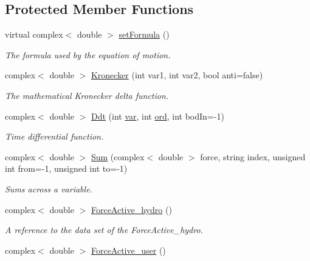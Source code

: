 \subsection*{Protected Member Functions}
\begin{DoxyCompactItemize}
\item 
virtual complex$<$ double $>$ \hyperlink{class_equationof_motion_a1d8614b11de9396f3795e4b560e6c368}{set\-Formula} ()
\begin{DoxyCompactList}\small\item\em The formula used by the equation of motion. \end{DoxyCompactList}\item 
complex$<$ double $>$ \hyperlink{class_equationof_motion_ad4ba6707460a9db7f8103157af0cae65}{Kronecker} (int var1, int var2, bool anti=false)
\begin{DoxyCompactList}\small\item\em The mathematical Kronecker delta function. \end{DoxyCompactList}\item 
complex$<$ double $>$ \hyperlink{class_equationof_motion_af12570e012041ea91d81820735b14c74}{Ddt} (int \hyperlink{class_equationof_motion_ab69511cc5037376cf7da80ce30d9eaab}{var}, int \hyperlink{class_equationof_motion_a31f904818ce75c9e2a2b5cff9fc707a5}{ord}, int bod\-In=-\/1)
\begin{DoxyCompactList}\small\item\em Time differential function. \end{DoxyCompactList}\item 
complex$<$ double $>$ \hyperlink{class_equationof_motion_a1f81cfba0e5b2e2ab9e3b70a9930208d}{Sum} (complex$<$ double $>$ force, string index, unsigned int from=-\/1, unsigned int to=-\/1)
\begin{DoxyCompactList}\small\item\em Sums across a variable. \end{DoxyCompactList}\item 
complex$<$ double $>$ \hyperlink{class_equationof_motion_a61f33c3fd47ae2b66db1982b9c973ec1}{Force\-Active\-\_\-hydro} ()
\begin{DoxyCompactList}\small\item\em A reference to the data set of the Force\-Active\-\_\-hydro. \end{DoxyCompactList}\item 
complex$<$ double $>$ \hyperlink{class_equationof_motion_a238df115825cbe08522bdc10b84880b9}{Force\-Active\-\_\-user} ()

\end{DoxyCompactItemize}
